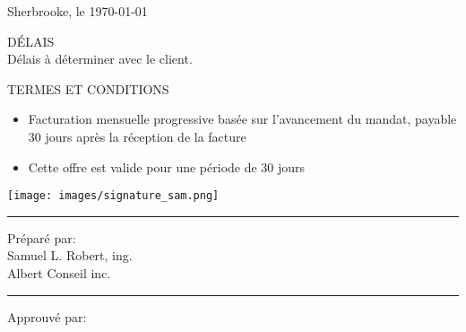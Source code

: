 \documentclass[12pt, letterpaper]{letter}
\begin{document}
\pagestyle{logo}
\begin{flushleft}

Sherbrooke, le \today \\
\vspace{0.5cm}

\end{flushleft}
\vspace{1cm}


\par


\par
\begin{samepage}

\end{samepage}

\par
DÉLAIS \\
Délais à déterminer avec le client.

\par
TERMES ET CONDITIONS
\begin{itemize}
    \item[\textbullet] Facturation mensuelle progressive basée sur l'avancement du mandat, payable 30 jours après la réception de la facture
    \item[\textbullet] Cette offre est valide pour une période de 30 jours
\end{itemize}

\begin{flushleft}
\noindent 
\parbox[b]{0.45\linewidth}{%
    \strut 
    \begin{center}
    \texttt{[image: images/signature\_sam.png]}
    \end{center}
    \hrule\vspace{0.5cm}
    Préparé par:\\
    Samuel L. Robert, ing.\\
    Albert Conseil inc.\\
} 
\hspace{0.5cm} %
\parbox[b]{0.45\linewidth}{%
    \strut 
    \vspace{1.5cm}
    \hrule\vspace{0.5cm}
    Approuvé par:\\
    }
\end{flushleft}
\par\vspace{1cm} 
\end{document}

